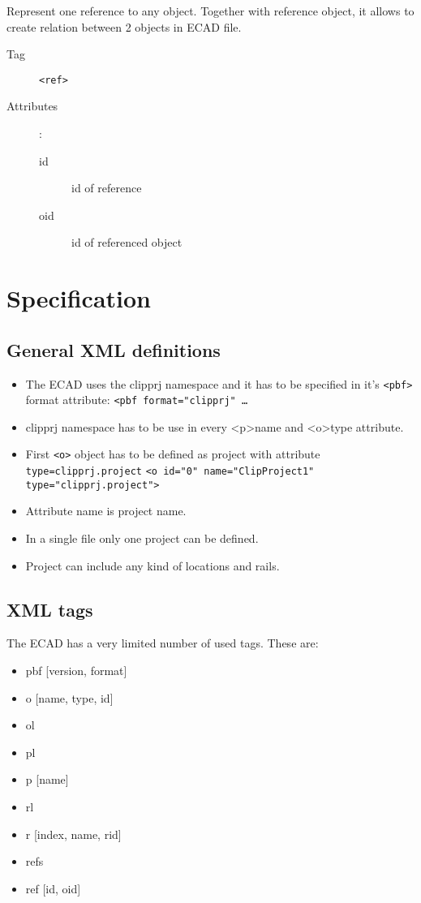 \documentclass[%
	a4paper,
	oneside,
	listof=numbered,
	parskip=half,
	headsepline=true,
	footsepline=true,
	]{scrbook}
\begin{document}
Represent one reference to any object. Together with reference object, it allows to create relation between 2 objects in ECAD file.

\begin{description}
	\item[Tag] \verb|<ref>|
	\item[Attributes]:
	
	\begin{description}
		\item[id] id of reference
		\item[oid] id of referenced object
	\end{description}
\end{description}

\chapter{Specification}

\section{General XML definitions}

\begin{itemize}
	\item The ECAD uses the clipprj namespace and it has to be specified in it’s \verb|<pbf>| format attribute: \verb|<pbf format="clipprj" …| 
	\item clipprj namespace has to be use in every <p>name and <o>type attribute. 
	\item  First \verb|<o>| object has to be defined as project with attribute \verb|type=clipprj.project|
	\verb|<o id="0" name="ClipProject1" type="clipprj.project">|
	\item Attribute name is project name. 
	\item In a single file only one project can be defined. 
	\item Project can include any kind of locations and rails.
\end{itemize}

\section{XML tags}

The ECAD has a very limited number of used tags. These are:

\begin{itemize}
	\item pbf [version, format] 
	\item o [name, type, id] 
	\item ol 
	\item pl 
	\item p [name] 
	\item rl 
	\item r [index, name, rid] 
	\item refs 
	\item ref [id, oid] 
\end{itemize}
\end{document}
